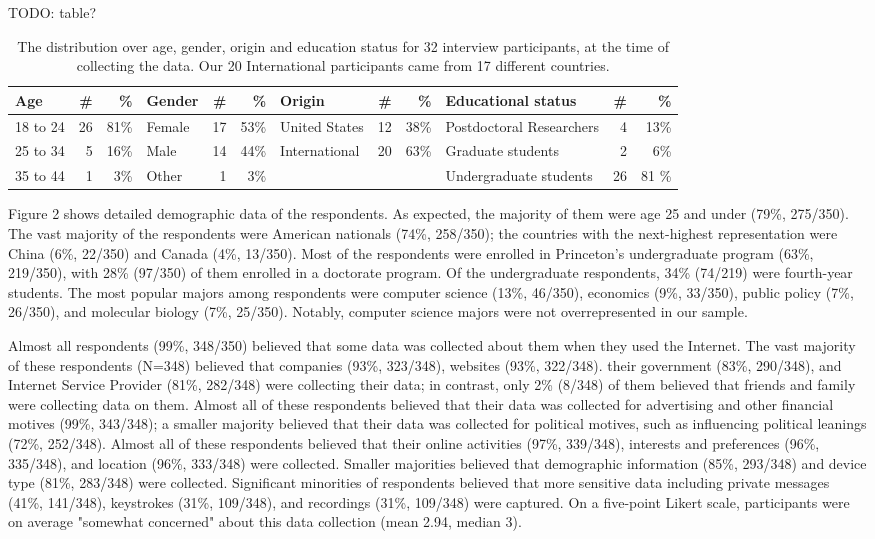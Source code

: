 TODO: table?


\begin{table*}[h!]
\centering
\begin{tabular}{l r r |l r r|l r r|l r r} 
 \hline
 Age & \# & \% & Gender & \# & \% & Origin & \# & \% & Educational status & \# & \% \\
\hline
18 to 24 & 26 & 81\% & Female & 17 & 53\% & United States & 12 & 38\% & Postdoctoral Researchers & 4 & 13\% \\
25 to 34 & 5 & 16\% & Male & 14 & 44\% & International & 20 & 63\% & Graduate students & 2 & 6\% \\
35 to 44 & 1 & 3\% & Other & 1 & 3\% & & & & Undergraduate students & 26 & 81 \% \\
 \hline
\end{tabular}
\caption{The distribution over age, gender, origin and education status for 32 interview participants, at the time of collecting the data. Our 20 International participants came from 17 different countries.}
\label{table:1}
\end{table*}


Figure 2 shows detailed demographic data of the respondents. As expected, the
majority of them were age 25 and under (79\%, 275/350). The vast majority of
the respondents were American nationals (74\%, 258/350); the countries with
the next-highest representation were China (6\%, 22/350) and Canada (4\%,
13/350). Most of the respondents were enrolled in Princeton's undergraduate
program (63\%, 219/350), with 28\% (97/350) of them enrolled in a doctorate
program. Of the undergraduate respondents, 34\% (74/219) were fourth-year
students. The most popular majors among respondents were computer science
(13\%, 46/350), economics (9\%, 33/350), public policy (7\%, 26/350), and
molecular biology (7\%, 25/350). Notably, computer science majors were not
overrepresented in our sample.

Almost all respondents (99\%, 348/350) believed that some data was collected
about them when they used the Internet. The vast majority of these respondents
(N=348) believed that companies (93\%, 323/348), websites (93\%, 322/348).
their government (83\%, 290/348), and Internet Service Provider (81\%,
282/348) were collecting their data; in contrast, only 2\% (8/348) of them
believed that friends and family were collecting data on them. Almost all of
these respondents believed that their data was collected for advertising and
other financial motives (99\%, 343/348); a smaller majority believed that
their data was collected for political motives, such as influencing political
leanings (72\%, 252/348). Almost all of these respondents believed that their
online activities (97\%, 339/348), interests and preferences (96\%, 335/348),
and location (96\%, 333/348) were collected. Smaller majorities believed that
demographic information (85\%, 293/348) and device type (81\%, 283/348) were
collected. Significant minorities of respondents believed that more sensitive
data including private messages (41\%, 141/348), keystrokes (31\%, 109/348),
and recordings (31\%, 109/348) were captured. On a five-point Likert scale,
participants were on average "somewhat concerned" about this data collection
(mean 2.94, median 3).

